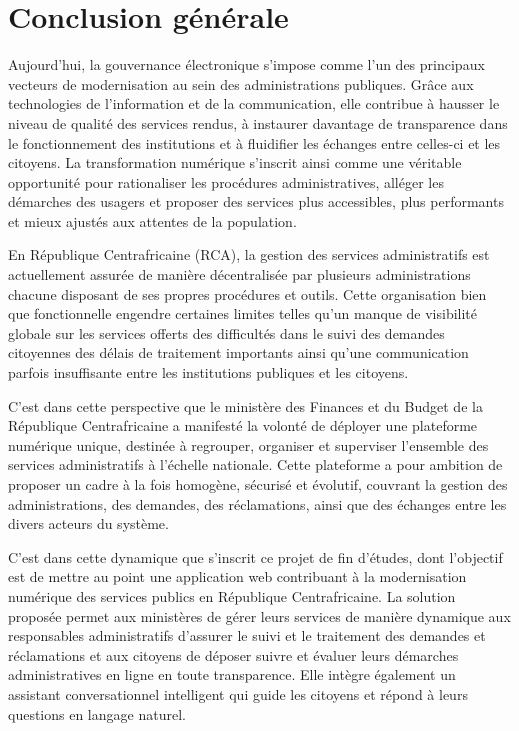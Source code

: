 \chapter*{Conclusion générale}

Aujourd'hui, la gouvernance électronique s'impose comme l'un des principaux vecteurs de modernisation au sein des administrations publiques. Grâce aux technologies de l'information et de la communication, elle contribue à hausser le niveau de qualité des services rendus, à instaurer davantage de transparence dans le fonctionnement des institutions et à fluidifier les échanges entre celles-ci et les citoyens. La transformation numérique s'inscrit ainsi comme une véritable opportunité pour rationaliser les procédures administratives, alléger les démarches des usagers et proposer des services plus accessibles, plus performants et mieux ajustés aux attentes de la population. 

En République Centrafricaine (RCA), la gestion des services administratifs est actuellement assurée de manière décentralisée par plusieurs administrations chacune disposant de ses propres procédures et outils. Cette organisation bien que fonctionnelle engendre certaines limites telles qu'un manque de visibilité globale sur les services offerts des difficultés dans le suivi des demandes citoyennes des délais de traitement importants ainsi qu'une communication parfois insuffisante entre les institutions publiques et les citoyens.

C'est dans cette perspective que le ministère des Finances et du Budget de la République Centrafricaine a manifesté la volonté de déployer une plateforme numérique unique, destinée à regrouper, organiser et superviser l'ensemble des services administratifs à l'échelle nationale. Cette plateforme a pour ambition de proposer un cadre à la fois homogène, sécurisé et évolutif, couvrant la gestion des administrations, des demandes, des réclamations, ainsi que des échanges entre les divers acteurs du système. 

C'est dans cette dynamique que s'inscrit ce projet de fin d'études, dont l'objectif est de mettre au point une application web contribuant à la modernisation numérique des services publics en République Centrafricaine. La solution proposée permet aux ministères de gérer leurs services de manière dynamique aux responsables administratifs d'assurer le suivi et le traitement des demandes et réclamations et aux citoyens de déposer suivre et évaluer leurs démarches administratives en ligne en toute transparence. Elle intègre également un assistant conversationnel intelligent qui guide les citoyens et répond à leurs questions en langage naturel.

